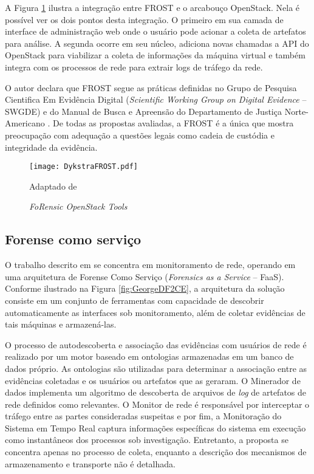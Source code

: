 A Figura \ref{fig:DykstraFROST} ilustra a integração entre FROST e o arcabouço OpenStack.
%
Nela é possível ver os dois pontos desta integração. O primeiro em sua camada de interface de administração web onde o usuário pode acionar a coleta de artefatos para análise.
%
A segunda ocorre em seu núcleo, adiciona novas chamadas a API do OpenStack para viabilizar a coleta de informações da máquina virtual e também integra com os processos de rede para extrair logs de tráfego da rede.


O autor declara que FROST segue as práticas definidas no Grupo de Pesquisa Cientifica Em Evidência Digital (\textit{Scientific Working Group on Digital Evidence} -- SWGDE) e do Manual de Busca e Apreensão do Departamento de Justiça Norte-Americano \cite{DykstraFROST:2013}.
%
De todas as propostas avaliadas, a FROST é a única que mostra preocupação com adequação a questões legais como cadeia de custódia e integridade da evidência.
%


\begin{figure}[htb!]
\footnotesize
\caption{\textit{FoRensic OpenStack Tools}}
\texttt{[image: DykstraFROST.pdf]}
\centering
\label{fig:DykstraFROST}
\begin{center}
Adaptado de \cite{DykstraFROST:2013} 
\end{center}
\end{figure}
%


\subsection{Forense como serviço}
\label{sec:frost}

O trabalho descrito em \cite{GeorgeDF2CE:2012} se concentra em monitoramento de rede, operando em uma arquitetura de Forense Como Serviço (\textit{Forensics as a Service} -- FaaS). 
%
Conforme ilustrado na Figura \ref{fig:GeorgeDF2CE}, a arquitetura da solução consiste em um conjunto de ferramentas com capacidade de descobrir automaticamente as interfaces sob monitoramento, além de coletar evidências de tais máquinas e armazená-las.


O processo de autodescoberta e associação das evidências com usuários de rede é realizado por um motor baseado em ontologias armazenadas em um banco de dados próprio. 
%
As ontologias são utilizadas para determinar a associação entre as evidências coletadas e os usuários ou artefatos que as geraram.
%
O Minerador de dados implementa um algoritmo de descoberta de arquivos de \textit{log} de artefatos de rede definidos como relevantes.
%
O Monitor de rede é responsável por interceptar o tráfego entre as partes consideradas suspeitas e por fim, a Monitoração do Sistema em Tempo Real captura informações específicas do sistema em execução como instantâneos dos processos sob investigação.
%
Entretanto, a proposta se concentra apenas no processo de coleta, enquanto a descrição dos mecanismos de armazenamento e transporte não é detalhada.


